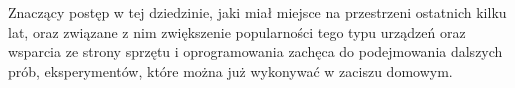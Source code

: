 Znaczący postęp w tej dziedzinie, jaki miał miejsce na przestrzeni ostatnich kilku lat, oraz związane z nim zwiększenie popularności tego typu urządzeń oraz wsparcia ze strony sprzętu i oprogramowania zachęca do podejmowania dalszych prób, eksperymentów, które można już wykonywać w zaciszu domowym.
